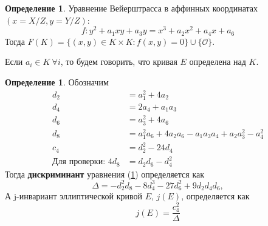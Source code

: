\documentclass[12pt]{article}
\newcommand*{\union}{\mathbin{\cup}}
\newcommand{\bigO}{\mathcal{O}}
\theoremstyle{definition}
\newtheorem{definition}[theorem]{Определение}
\theoremstyle{definition}
\theoremstyle{definition}
\begin{document}
            \begin{definition} 
            \label{eq:weierstrassaffine}
                Уравнение Вейерштрасса в аффинных координатах $(x=X/Z, y=Y/Z)$:
                \begin{equation}\label{eq:weierstrassequation}
                    f: y^2+a_1xy + a_3y = x^3 + a_2x^2 + a_4x + a_6
                \end{equation}
                Тогда $F(K) = \{ (x,y) \in K \times K: f(x,y)=0 \} \union \{\bigO\}$.
                
                Если $a_i \in K \  \forall i$, то будем говорить, что кривая $E$ определена над $K$.
            \end{definition}
            
            \begin{definition}
                Обозначим
                \begin{align}
                    d_2 &= a_1^2 + 4a_2 \\ \nonumber
                    d_4 &= 2a_4 + a_1a_3 \\ \nonumber
                    d_6 &= a_3^2 + 4a_6 \\ \nonumber
                    d_8 &= a_1^2a_6 + 4a_2a_6 - a_1a_3a_4 + a_2a_3^2 - a_4^2 \\ \nonumber
                    c_4 &= d_2^2 - 24d_4 \\ \nonumber
                    \text{Для проверки: } 4d_8 &= d_2d_6 - d_4^2
                \end{align}
                Тогда \textbf{дискриминант} уравнения (\ref{eq:weierstrassaffine}) определяется как 
                \[
                    \Delta = -d_2^2d_8 - 8d_4^3-27d_6^2+9d_2d_4d_6,
                \]
                А j-инвариант эллиптической кривой $E$, $j(E)$, определяется как 
                \[
                    j(E) = \frac{c_4^2}{\Delta}
                \]
            \end{definition}
            
\end{document}
